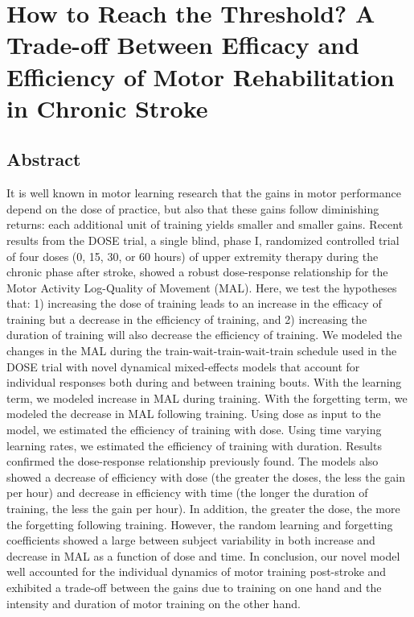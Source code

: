 \chapter{How to Reach the Threshold? A Trade-off Between Efficacy and Efficiency of Motor Rehabilitation in Chronic Stroke}
\label{cha:dose}

\section{Abstract}
It is well known in motor learning research that the gains in motor performance depend on the dose of practice, but also that these gains follow diminishing returns: each additional unit of training yields smaller and smaller gains. 
Recent results from the DOSE trial, a single blind, phase I, randomized controlled trial of four doses (0, 15, 30, or 60 hours) of upper extremity therapy during the chronic phase after stroke, showed a robust dose-response relationship for the Motor Activity Log-Quality of Movement (MAL).  
Here, we test the hypotheses that: 1) increasing the dose of training leads to an increase in the efficacy of training but a decrease in the efficiency of training, and 2) increasing the duration of training will also decrease the efficiency of training. 
We modeled the changes in the MAL during the train-wait-train-wait-train schedule used in the DOSE trial with novel dynamical mixed-effects models that account for individual responses both during and between training bouts. 
With the learning term, we modeled increase in MAL during training.  
With the forgetting term, we modeled the decrease in MAL following training. 
Using dose as input to the model, we estimated the efficiency of training with dose. 
Using time varying learning rates, we estimated the efficiency of training with duration. 
Results confirmed the dose-response relationship previously found. 
The models also showed a decrease of efficiency with dose (the greater the doses, the less the gain per hour) and decrease in efficiency with time (the longer the duration of training, the less the gain per hour). 
In addition, the greater the dose, the more the forgetting following training. 
However, the random learning and forgetting coefficients showed a large between subject variability in both increase and decrease in MAL as a function of dose and time. 
In conclusion, our novel model well accounted for the individual dynamics of motor training post-stroke and exhibited a trade-off between the gains due to training on one hand and the intensity and duration of motor training on the other hand. 


